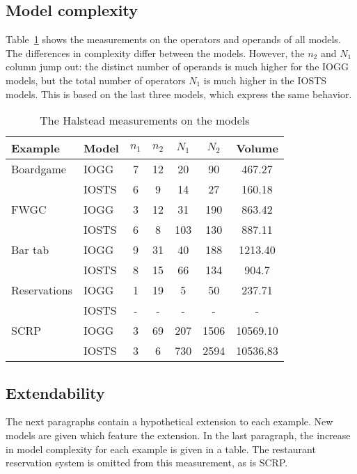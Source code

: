 \subsection{Model complexity}
Table~\ref{tab:halstead} shows the measurements on the operators and operands of all models.  The differences in complexity differ between the models. However, the $n_2$ and $N_1$ column jump out: the distinct number of operands is much higher for the IOGG models, but the total number of operators $N_1$ is much higher in the IOSTS models. This is based on the last three models, which express the same behavior.

\begin{table}[ht]
\begin{center}
\begin{tabular}{| l | l | c | c | c | c | c |}
  \hline
  \textbf{Example} & \textbf{Model} & $n_1$ & $n_2$ & $N_1$ & $N_2$ & Volume \\ \hline
  Boardgame & IOGG & 7 & 12 & 20 & 90 & 467.27 \\ \cline{2-7}
  & IOSTS & 6 & 9 & 14 & 27 & 160.18 \\ \hline
  FWGC & IOGG & 3 & 12 & 31 & 190 & 863.42 \\ \cline{2-7}
  & IOSTS & 6 & 8 & 103 & 130 & 887.11 \\ \hline
  Bar tab & IOGG & 9 & 31 & 40 & 188 & 1213.40 \\ \cline{2-7}
  & IOSTS & 8 & 15 & 66 & 134 & 904.7 \\ \hline
  Reservations & IOGG & 1 & 19 & 5 & 50 & 237.71 \\ \cline{2-7}
  & IOSTS & - & - & - & - & - \\ \hline
  SCRP & IOGG & 3 & 69 & 207 & 1506 & 10569.10 \\ \cline{2-7}
  & IOSTS & 3 & 6 & 730 & 2594 & 10536.83 \\ \hline
\end{tabular}
\end{center}
\caption{The Halstead measurements on the models}
\label{tab:halstead}
\end{table}

\subsection{Extendability}
The next paragraphs contain a hypothetical extension to each example. New models are given which feature the extension. In the last paragraph, the increase in model complexity for each example is given in a table. The restaurant reservation system is omitted from this measurement, as is SCRP.

